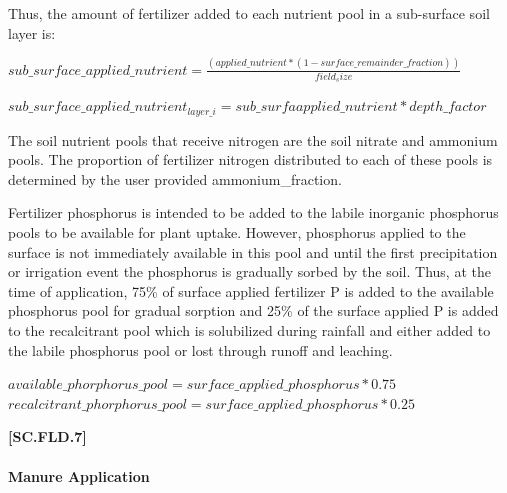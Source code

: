 Thus, the amount of fertilizer added to each nutrient pool in a sub-surface soil layer is: 
            \vspace{0.5cm} 
    
    \begin{center}
        \(sub\_surface\_applied\_nutrient=\frac{(applied\_nutrient * (1- surface\_remainder\_fraction))}{field_size}\)
    \end{center}
        \vspace{0.25cm} 

    \begin{center}
        \(sub\_surface\_applied\_nutrient_{layer\_i}=sub\_surfaapplied\_nutrient * depth\_factor\)
    \end{center}
        \vspace{0.25cm} 

The soil nutrient pools that receive nitrogen are the soil nitrate and ammonium pools. The proportion of fertilizer nitrogen distributed to each of these pools is determined by the user provided ammonium\_fraction.
\vspace{0.2cm}

Fertilizer phosphorus is intended to be added to the labile inorganic phosphorus pools to be available for plant uptake. However, phosphorus applied to the surface is not immediately available in this pool and until the first precipitation or irrigation event the phosphorus is gradually sorbed by the soil. Thus, at the time of application, 75\% of surface applied fertilizer P is added to the available phosphorus pool for gradual sorption and 25\% of the surface applied P is added to the recalcitrant pool which is solubilized during rainfall and either added to the labile phosphorus pool or lost through runoff and leaching.
            \vspace{0.5cm} 
    
    \begin{center}
        \(available\_phorphorus\_pool=surface\_applied\_phosphorus * 0.75\)\\		

        \(recalcitrant\_phorphorus\_pool=surface\_applied\_phosphorus * 0.25\)
    \end{center}
        \vspace{0.5cm} 
    
            {\raggedleft \textbf{[SC.FLD.7]}\par}
            \vspace{0.5cm} 

\paragraph{Manure Application}
\vspace{-0.25cm}

